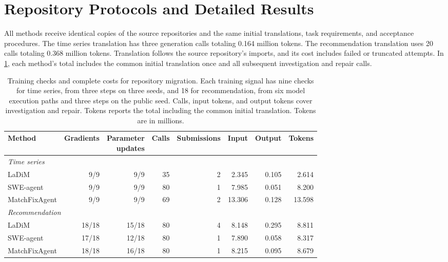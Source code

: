\documentclass{article}
\newcommand{\thead}[1]{\textbf{\shortstack[b]{#1}}}
\begin{document}
\section{Repository Protocols and Detailed Results}
\label{sec:repository-results}
All methods receive identical copies of the source repositories and the same initial translations, task requirements, and acceptance procedures. The time series translation has three generation calls totaling 0.164 million tokens. The recommendation translation uses 20 calls totaling 0.368 million tokens. Translation follows the source repository's imports, and its cost includes failed or truncated attempts. In \cref{tab:repository-costs}, each method's total includes the common initial translation once and all subsequent investigation and repair calls.
\begin{table}[!htb]
\caption{Training checks and complete costs for repository migration. Each training signal has nine checks for time series, from three steps on three seeds, and 18 for recommendation, from six model execution paths and three steps on the public seed. Calls, input tokens, and output tokens cover investigation and repair. Tokens reports the total including the common initial translation. Tokens are in millions.}
\label{tab:repository-costs}
\centering
\small
\setlength{\tabcolsep}{2pt}

\begin{tabular*}{\linewidth}{@{\extracolsep{\fill}}lrrrrrrr@{}}
\toprule
\textbf{Method} & \textbf{Gradients} & \thead{Parameter\\updates} & \textbf{Calls} & \textbf{Submissions} & \textbf{Input} & \textbf{Output} & \textbf{Tokens} \\
\midrule
\multicolumn{8}{l}{\textit{Time series}} \\
LaDiM & 9/9 & 9/9 & 35 & 2 & 2.345 & 0.105 & 2.614 \\
SWE-agent & 9/9 & 9/9 & 80 & 1 & 7.985 & 0.051 & 8.200 \\
MatchFixAgent & 9/9 & 9/9 & 69 & 2 & 13.306 & 0.128 & 13.598 \\
\midrule
\multicolumn{8}{l}{\textit{Recommendation}} \\
LaDiM & 18/18 & 15/18 & 80 & 4 & 8.148 & 0.295 & 8.811 \\
SWE-agent & 17/18 & 12/18 & 80 & 1 & 7.890 & 0.058 & 8.317 \\
MatchFixAgent & 18/18 & 16/18 & 80 & 1 & 8.215 & 0.095 & 8.679 \\
\bottomrule
\end{tabular*}


\end{table}
\end{document}
